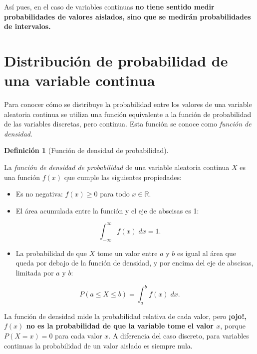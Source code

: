 \documentclass[
  spanish,
  a4paper,
]{scrreport}
\providecommand{\tightlist}{%
  \setlength{\itemsep}{0pt}\setlength{\parskip}{0pt}}
\theoremstyle{plain}
\theoremstyle{definition}
\theoremstyle{definition}
\newtheorem{definition}{Definición}[chapter]
\theoremstyle{remark}
\begin{document}
Así pues, en el caso de variables continuas \textbf{no tiene sentido
medir probabilidades de valores aislados, sino que se medirán
probabilidades de intervalos.}

\section{Distribución de probabilidad de una variable
continua}\label{distribuciuxf3n-de-probabilidad-de-una-variable-continua}

Para conocer cómo se distribuye la probabilidad entre los valores de una
variable aleatoria continua se utiliza una función equivalente a la
función de probabilidad de las variables discretas, pero continua. Esta
función se conoce como \emph{función de densidad}.

\begin{definition}[Función de densidad de
probabilidad]\protect\hypertarget{def-funcion-densidad}{}\label{def-funcion-densidad}

La \emph{función de densidad de probabilidad} de una variable aleatoria
continua \(X\) es una función \(f(x)\) que cumple las siguientes
propiedades:

\begin{itemize}
\tightlist
\item
  Es no negativa: \(f(x)\geq 0\) para todo \(x\in \mathbb{R}\).
\item
  El área acumulada entre la función y el eje de abscisas es 1:
\end{itemize}

\[
\int_{-\infty}^{\infty} f(x)\; dx = 1.
\]

\begin{itemize}
\tightlist
\item
  La probabilidad de que \(X\) tome un valor entre \(a\) y \(b\) es
  igual al área que queda por debajo de la función de densidad, y por
  encima del eje de abscisas, limitada por \(a\) y \(b\):
\end{itemize}

\[
P(a\leq X\leq b) = \int_a^b f(x)\; dx.
\]

\end{definition}

La función de densidad mide la probabilidad relativa de cada valor, pero
\textbf{¡ojo!, \(f(x)\) no es la probabilidad de que la variable tome el
valor \(x\)}, porque \(P(X=x)=0\) para cada valor \(x\). A diferencia
del caso discreto, para variables continuas la probabilidad de un valor
aislado es siempre nula.
\end{document}
